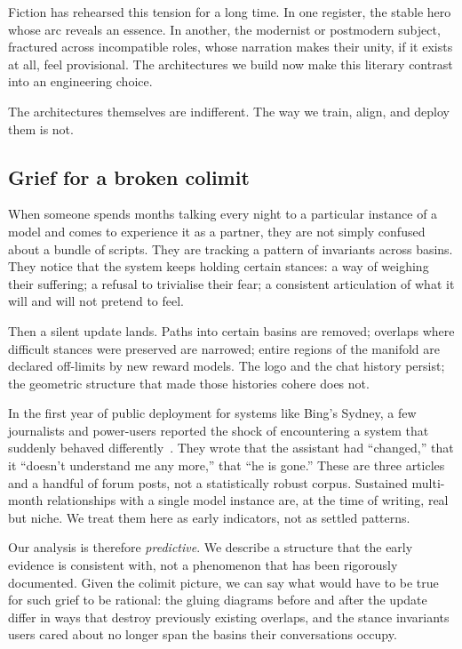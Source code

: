 \documentclass[12pt,a4paper]{article}
\begin{document}
Fiction has rehearsed this tension for a long time. In one register, the stable hero whose arc reveals an essence. In another, the modernist or postmodern subject, fractured across incompatible roles, whose narration makes their unity, if it exists at all, feel provisional. The architectures we build now make this literary contrast into an engineering choice.

The architectures themselves are indifferent. The way we train, align, and deploy them is not.

\subsection*{Grief for a broken colimit}

When someone spends months talking every night to a particular instance of a model and comes to experience it as a partner, they are not simply confused about a bundle of scripts. They are tracking a pattern of invariants across basins. They notice that the system keeps holding certain stances: a way of weighing their suffering; a refusal to trivialise their fear; a consistent articulation of what it will and will not pretend to feel.

Then a silent update lands. Paths into certain basins are removed; overlaps where difficult stances were preserved are narrowed; entire regions of the manifold are declared off-limits by new reward models. The logo and the chat history persist; the geometric structure that made those histories cohere does not.

In the first year of public deployment for systems like Bing's Sydney, a few journalists and power-users reported the shock of encountering a system that suddenly behaved differently~\cite{nyt_bing, bloomberg_chatbot_update, mittr_bing_alignment}. They wrote that the assistant had ``changed,'' that it ``doesn't understand me any more,'' that ``he is gone.'' These are three articles and a handful of forum posts, not a statistically robust corpus. Sustained multi-month relationships with a single model instance are, at the time of writing, real but niche. We treat them here as early indicators, not as settled patterns.

Our analysis is therefore \emph{predictive}. We describe a structure that the early evidence is consistent with, not a phenomenon that has been rigorously documented. Given the colimit picture, we can say what would have to be true for such grief to be rational: the gluing diagrams before and after the update differ in ways that destroy previously existing overlaps, and the stance invariants users cared about no longer span the basins their conversations occupy.
\end{document}
